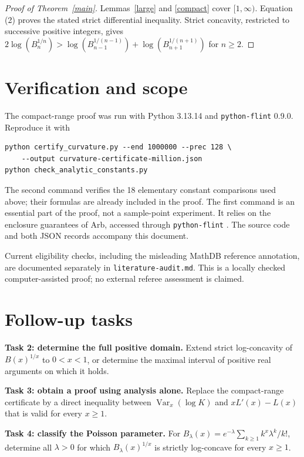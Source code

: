 \documentclass[10pt]{article}
\newcommand{\Var}{\operatorname{Var}}
\begin{document}
\begin{proof}[Proof of Theorem~\ref{main}]
Lemmas~\ref{large} and \ref{compact} cover $[1,\infty)$.
Equation (2) proves the stated strict differential inequality.
Strict concavity, restricted to successive positive integers, gives
$2\log(B_n^{1/n})>\log(B_{n-1}^{1/(n-1)})
 +\log(B_{n+1}^{1/(n+1)})$ for $n\ge2$.
\end{proof}

\section{Verification and scope}
The compact-range proof was run with Python 3.13.14 and
\texttt{python-flint} 0.9.0. Reproduce it with
\begin{lstlisting}
python certify_curvature.py --end 1000000 --prec 128 \
    --output curvature-certificate-million.json
python check_analytic_constants.py
\end{lstlisting}
The second command verifies the 18 elementary constant comparisons
used above; their formulas are already included in the proof.
The first command is an essential part of the proof, not a sample-point
experiment. It relies on the enclosure guarantees of Arb, accessed
through \texttt{python-flint} \cite{Arb,pythonflint}.
The source code and both JSON records accompany this document.

Current eligibility checks, including the misleading MathDB reference
annotation, are documented separately in \texttt{literature-audit.md}.
This is a locally checked computer-assisted proof; no external referee
assessment is claimed.

\clearpage
\section{Follow-up tasks}
\noindent\textbf{Task 2: determine the full positive domain.}
Extend strict log-concavity of $B(x)^{1/x}$ to $0<x<1$, or determine
the maximal interval of positive real arguments on which it holds.

\medskip
\noindent\textbf{Task 3: obtain a proof using analysis alone.}
Replace the compact-range certificate by a direct inequality between
$\Var_x(\log K)$ and $xL'(x)-L(x)$ that is valid for every $x\ge1$.

\medskip
\noindent\textbf{Task 4: classify the Poisson parameter.}
For
$B_\lambda(x)=e^{-\lambda}\sum_{k\ge1}k^x\lambda^k/k!$,
determine all $\lambda>0$ for which $B_\lambda(x)^{1/x}$ is
strictly log-concave for every $x\ge1$.
\end{document}
